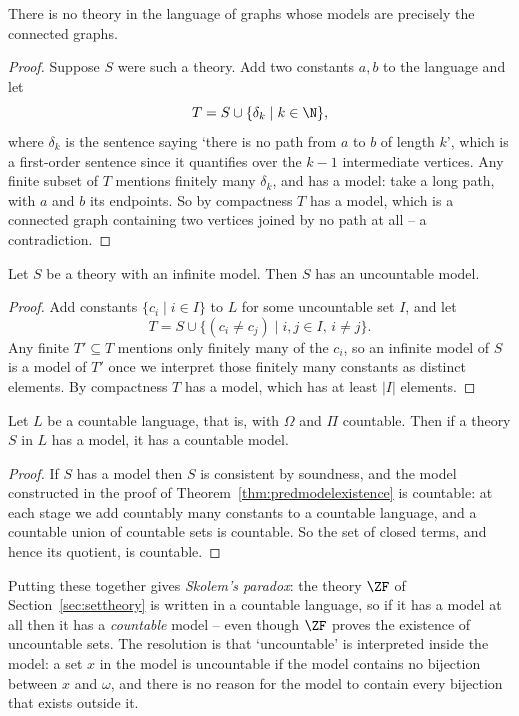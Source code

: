 \begin{corollary}
  There is no theory in the language of graphs whose models are precisely the connected graphs.
\end{corollary}
\begin{proof}
  Suppose $S$ were such a theory. Add two constants $a, b$ to the language and let
  $$T = S \cup \{\delta_k \mid k \in \N\},$$
  where $\delta_k$ is the sentence saying `there is no path from $a$ to $b$ of length $k$', which is a first-order sentence since it quantifies over the $k-1$ intermediate vertices. Any finite subset of $T$ mentions finitely many $\delta_k$, and has a model: take a long path, with $a$ and $b$ its endpoints. So by compactness $T$ has a model, which is a connected graph containing two vertices joined by no path at all -- a contradiction.
\end{proof}

\begin{theorem}
  Let $S$ be a theory with an infinite model. Then $S$ has an uncountable model.
\end{theorem}
\begin{proof}
  Add constants $\{c_i \mid i \in I\}$ to $L$ for some uncountable set $I$, and let
  $$T = S \cup \{(c_i \neq c_j) \mid i, j \in I, \, i \neq j\}.$$
  Any finite $T' \subseteq T$ mentions only finitely many of the $c_i$, so an infinite model of $S$ is a model of $T'$ once we interpret those finitely many constants as distinct elements. By compactness $T$ has a model, which has at least $|I|$ elements.
\end{proof}

\begin{theorem}
  Let $L$ be a countable language, that is, with $\Omega$ and $\Pi$ countable. Then if a theory $S$ in $L$ has a model, it has a countable model.
\end{theorem}
\begin{proof}
  If $S$ has a model then $S$ is consistent by soundness, and the model constructed in the proof of Theorem~\ref{thm:predmodelexistence} is countable: at each stage we add countably many constants to a countable language, and a countable union of countable sets is countable. So the set of closed terms, and hence its quotient, is countable.
\end{proof}

Putting these together gives \emph{Skolem's paradox}: the theory $\ZF$ of Section~\ref{sec:settheory} is written in a countable language, so if it has a model at all then it has a \emph{countable} model -- even though $\ZF$ proves the existence of uncountable sets. The resolution is that `uncountable' is interpreted inside the model: a set $x$ in the model is uncountable if the model contains no bijection between $x$ and $\omega$, and there is no reason for the model to contain every bijection that exists outside it.

